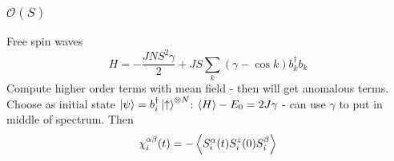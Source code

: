 \documentclass{article}
\begin{document}
\subsubsection{$\mathcal{O}(S)$}
%
Free spin waves
\begin{equation}
    H = -\frac{JNS^2 \gamma}{2} + JS\sum_{k}(\gamma-\cos{k}) b_k^\dagger b_k
\end{equation}
Compute higher order terms with mean field - then will get anomalous terms.
Choose as initial state $\ket{\psi} = b_i^\dagger \ket{\uparrow}^{\otimes N}$: $\ev{H}-E_0 = 2J\gamma$ - can use $\gamma$ to put in middle of spectrum. Then 
%
\begin{equation}
    \chi_i^{\alpha\beta}(t) = -\ev{S_i^\alpha(t)S_i^z(0)S_i^\beta}
\end{equation}
\end{document}
